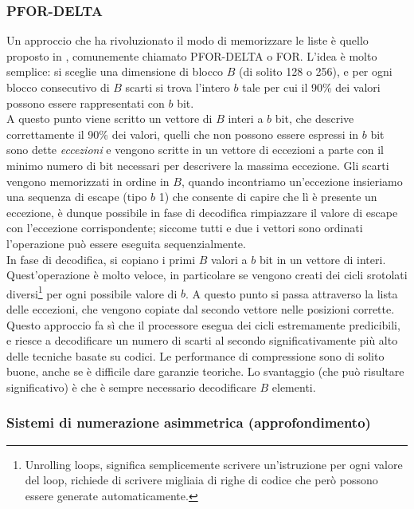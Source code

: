 \subsubsection{PFOR-DELTA}
Un approccio che ha rivoluzionato il modo di memorizzare le liste è quello proposto in %
, comunemente chiamato PFOR-DELTA o FOR. L'idea è molto semplice: si sceglie una dimensione di blocco $B$ (di solito 128 o 256), e per ogni blocco consecutivo di $B$ scarti si trova l'intero $b$ tale per cui il 90\% dei valori possono essere rappresentati con $b$ bit.\\
A questo punto viene scritto un vettore di $B$ interi a $b$ bit, che descrive correttamente il 90\% dei valori, quelli che non possono essere espressi in $b$ bit sono dette \textit{eccezioni} e vengono scritte in un vettore di eccezioni a parte con il minimo numero di bit necessari per descrivere la massima eccezione. Gli scarti vengono memorizzati in ordine in $B$, quando incontriamo un'eccezione insieriamo una sequenza di escape (tipo $b$ 1) che consente di capire che lì è presente un eccezione, è dunque possibile in fase di decodifica rimpiazzare il valore di escape con l'eccezione corrispondente; siccome tutti e due i vettori sono ordinati l'operazione può essere eseguita sequenzialmente.\\
In fase di decodifica, si copiano i primi $B$ valori a $b$ bit in un vettore di interi. Quest'operazione è molto veloce, in particolare se vengono creati dei cicli srotolati diversi\footnote{Unrolling loops, significa semplicemente scrivere un'istruzione per ogni valore del loop, richiede di scrivere migliaia di righe di codice che però possono essere generate automaticamente.} per ogni possibile valore di $b$. A questo punto si passa attraverso la lista delle eccezioni, che vengono copiate dal secondo vettore nelle posizioni corrette.\\
Questo approccio fa sì che il processore esegua dei cicli estremamente predicibili, e riesce a decodificare un numero di scarti al secondo significativamente più alto delle tecniche basate su codici. Le performance di compressione sono di solito buone, anche se è difficile dare garanzie teoriche. Lo svantaggio (che può risultare significativo) è che è sempre necessario decodificare $B$ elementi.
\subsubsection{Sistemi di numerazione asimmetrica (approfondimento)}


